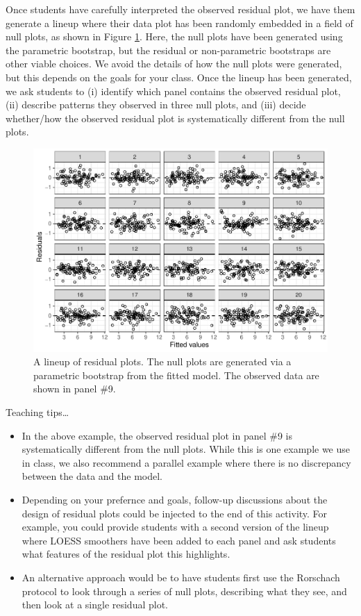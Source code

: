 \documentclass[12pt]{article}
\begin{document}
Once students have carefully interpreted the observed residual plot, we
have them generate a lineup where their data plot has been randomly
embedded in a field of null plots, as shown in Figure
\ref{fig:lineupresid}. Here, the null plots have been generated using
the parametric bootstrap, but the residual or non-parametric bootstraps
are other viable choices. We avoid the details of how the null plots
were generated, but this depends on the goals for your class. Once the
lineup has been generated, we ask students to (i) identify which panel
contains the observed residual plot, (ii) describe patterns they
observed in three null plots, and (iii) decide whether/how the observed
residual plot is systematically different from the null plots.

\begin{figure}
\centering
\includegraphics{figs/residual_lineup.pdf}
\caption{\label{fig:lineupresid} A lineup of residual plots. The null
plots are generated via a parametric bootstrap from the fitted model.
The observed data are shown in panel \#9.}
\end{figure}

Teaching tips\ldots{}

\begin{itemize}
\item
  In the above example, the observed residual plot in panel \#9 is
  systematically different from the null plots. While this is one
  example we use in class, we also recommend a parallel example where
  there is no discrepancy between the data and the model.
\item
  Depending on your prefernce and goals, follow-up discussions about the
  design of residual plots could be injected to the end of this
  activity. For example, you could provide students with a second
  version of the lineup where LOESS smoothers have been added to each
  panel and ask students what features of the residual plot this
  highlights.
\item
  An alternative approach would be to have students first use the
  Rorschach protocol to look through a series of null plots, describing
  what they see, and then look at a single residual plot.
\end{itemize}
\end{document}
